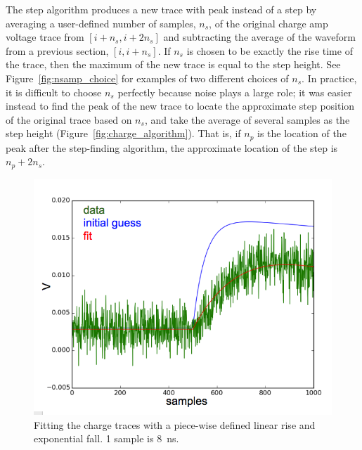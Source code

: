 The step algorithm produces a new trace with peak instead of a step by averaging a user-defined number of samples, $n_{s}$, of the original charge amp voltage trace from $[i+n_{s},i+2n_{s}]$ and subtracting the average of the waveform from a previous section, $[i,i+n_{s}]$. If $n_{s}$ is chosen to be exactly the rise time of the trace, then the maximum of the new trace is equal to the step height. See Figure~\ref{fig:nsamp_choice} for examples of two different choices of $n_{s}$. In practice, it is difficult to choose $n_{s}$ perfectly because noise plays a large role; it was easier instead to find the peak of the new trace to locate the approximate step position of the original trace based on $n_{s}$, and take the average of several samples as the step height (Figure~\ref{fig:charge_algorithm}). That is, if $n_{p}$ is the location of the peak after the step-finding algorithm, the approximate location of the step is $n_{p} + 2n_{s}$. 

 \begin{figure}[htbp]
\begin{center}
\includegraphics[width =\textwidth ]{figures/testbed/charge_fit.png}
\caption{Fitting the charge traces with a piece-wise defined linear rise and exponential fall. 1 sample is 8~ns.}
\label{fig:charge_fit}
\end{center}
\end{figure}

